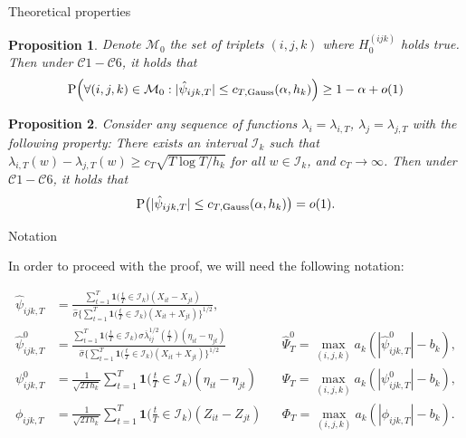 \documentclass[10pt]{beamer}
\newcommand{\Prob}{\mathrm{P}}
\newtheorem{prop}{Proposition}
\newcommand{\ind}{\boldsymbol{1}\Big( \frac{t}{T} \in \mathcal{I}_k \Big)} %
\newcommand{\indsmall}{\boldsymbol{1}\big( \frac{t}{T} \in \mathcal{I}_k \big)} %
\begin{document}
\begin{frame}{Theoretical properties}
\begin{prop}\label{prop1}
Denote $\mathcal{M}_0$ the set of triplets $(i, j, k)$ where $H_0^{(ijk)}$ holds true. Then under $\mathcal{C}1 - \mathcal{C}6$, it holds that 
\vspace{-2mm}
\begin{align*}
 \Prob\Big( \forall (i,j,k) \in \mathcal{M}_0: |\hat{\psi}_{ijk,T}| \le c_{T,\textnormal{Gauss}}(\alpha,h_k) \Big) \ge 1 - \alpha + o(1)
\end{align*}
\end{prop}\pause
\begin{prop}\label{prop2}
Consider any sequence of functions $\lambda_{i} = \lambda_{i,T}$, $\lambda_{j} = \lambda_{j, T}$ with the following property: There exists an interval $\mathcal{I}_{k}$ such that $\lambda_{i, T}(w) - \lambda_{j, T}(w) \ge c_T \sqrt{T \log T / h_{k}}$ for all $w \in \mathcal{I}_{k}$, and $c_T \rightarrow \infty$. Then under $\mathcal{C}1 - \mathcal{C}6$, it holds that
\[ \Prob\big(|\hat{\psi}_{ijk,T}| \le c_{T,\textnormal{Gauss}}(\alpha,h_k) \big) = o(1). \]
\end{prop}
\end{frame}

\begin{frame}{Notation}
\begin{center}
In order to proceed with the proof, we will need the following notation:
\end{center}
\vspace{-2mm}
\begin{align*}
\widehat{\psi}_{ijk, T} &= \frac{\sum\nolimits_{t=1}^T \indsmall (X_{it} -X_{jt})}{\hat{\sigma} \big\{ \sum\nolimits_{t=1}^T \indsmall  (X_{it} + X_{jt} )\big\}^{1/2}}, &&\\
\hat{\psi}_{ijk,T}^0 &= \frac{\sum\nolimits_{t=1}^T \indsmall \, \sigma \overline{\lambda}_{ij}^{1/2}(\frac{t}{T}) (\eta_{it} - \eta_{jt})}{ \hat{\sigma} \{ \sum\nolimits_{t=1}^T \indsmall (X_{it} + X_{jt}) \}^{1/2}} &&\hat{\Psi}_T^0 = \max_{(i,j,k)} a_k (|\hat{\psi}_{ijk,T}^0| - b_k),\\
\psi_{ijk,T}^0 &= \frac{1}{\sqrt{2Th_k}} \sum\limits_{t=1}^T \ind (\eta_{it} - \eta_{jt}) &&\Psi_T = \max_{(i,j,k)} a_k (|\psi_{ijk,T}^0| - b_k),\\
\phi_{ijk,T} &= \frac{1}{\sqrt{2 T h_k}} \sum\limits_{t=1}^T \ind (Z_{it} - Z_{jt}) &&\Phi_T = \max_{(i,j,k)} a_k (|\phi_{ijk,T}| - b_k).
\end{align*}
\end{frame}
\end{document}
